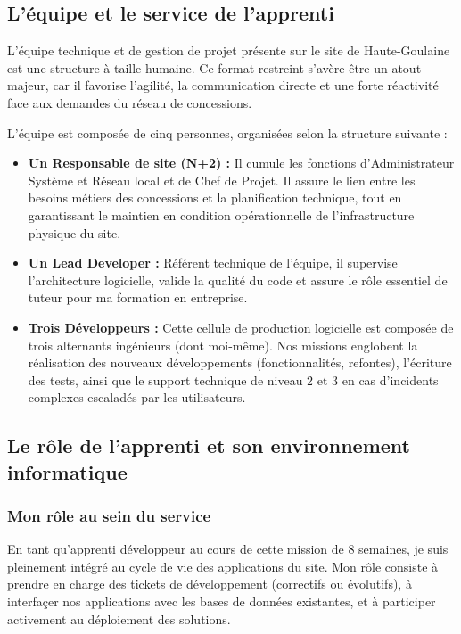 \subsection{L'équipe et le service de l'apprenti}

L'équipe technique et de gestion de projet présente sur le site de Haute-Goulaine est une structure à taille humaine. Ce format restreint s'avère être un atout majeur, car il favorise l'agilité, la communication directe et une forte réactivité face aux demandes du réseau de concessions.

L'équipe est composée de cinq personnes, organisées selon la structure suivante :

\begin{itemize}[label=\textbullet]
    \item \textbf{Un Responsable de site (N+2) :} Il cumule les fonctions d'Administrateur Système et Réseau local et de Chef de Projet. Il assure le lien entre les besoins métiers des concessions et la planification technique, tout en garantissant le maintien en condition opérationnelle de l'infrastructure physique du site.
    \item \textbf{Un Lead Developer :} Référent technique de l'équipe, il supervise l'architecture logicielle, valide la qualité du code et assure le rôle essentiel de tuteur pour ma formation en entreprise.
    \item \textbf{Trois Développeurs :} Cette cellule de production logicielle est composée de trois alternants ingénieurs (dont moi-même). Nos missions englobent la réalisation des nouveaux développements (fonctionnalités, refontes), l'écriture des tests, ainsi que le support technique de niveau 2 et 3 en cas d'incidents complexes escaladés par les utilisateurs.
\end{itemize}

\subsection{Le rôle de l'apprenti et son environnement informatique}

\subsubsection{Mon rôle au sein du service}

En tant qu'apprenti développeur au cours de cette mission de 8 semaines, je suis pleinement intégré au cycle de vie des applications du site. Mon rôle consiste à prendre en charge des tickets de développement (correctifs ou évolutifs), à interfaçer nos applications avec les bases de données existantes, et à participer activement au déploiement des solutions.

